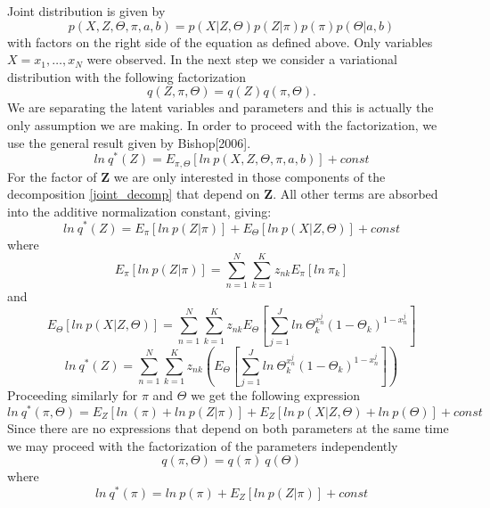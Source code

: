 \documentclass{article}
\newcommand\JointProb{p(X,Z,\Theta,\pi,a,b)}
\newcommand\ProbSingleCoin{\Theta_k^{x_n^j}(1-\Theta_k)^{1-x_n^j}}
\newcommand\SumK{\sum_{k=1}^{K}}
\newcommand\SumN{\sum_{n=1}^{N}}
\newcommand\SumJ{\sum_{j=1}^{J}}
\begin{document}
Joint distribution is given by
\begin{equation}\label{joint_decomp}
    \JointProb{} = p(X|Z,\Theta)p(Z|\pi)p(\pi)p(\Theta|a,b)
\end{equation}
with factors on the right side of the equation as defined above. Only variables $X={x_1,\dots,x_N}$ were observed. In the next step we consider a variational distribution with the following factorization
\begin{equation}\label{factor_decomp1}
q(Z, \pi, \Theta) = q(Z)q(\pi,\Theta).
\end{equation}
We are separating the latent variables and parameters and this is actually the only assumption we are making.
In order to proceed with the factorization, we use the general result given by Bishop[2006].
\begin{equation}
    ln\: q^*(Z)=E_{\pi,\Theta}[ln\:\JointProb] + const
\end{equation}
For the factor of \textbf{Z} we are only interested in those components of the decomposition \ref{joint_decomp} that depend on \textbf{Z}. All other terms are absorbed into the additive normalization constant, giving:
\begin{equation}
    ln\: q^*(Z)=E_{\pi}[ln\:p(Z|\pi)] + E_\Theta[ln\:p(X|Z,\Theta)] + const
\end{equation}
where
\begin{equation}
    E_{\pi}[ln\:p(Z|\pi)]  = \SumN\SumK z_{nk}E_\pi[ln\:\pi_k]
\end{equation}
and
\begin{equation}
    E_\Theta[ln\:p(X|Z,\Theta)] = \SumN\SumK z_{nk}E_\Theta[\SumJ ln\:\ProbSingleCoin]
\end{equation}
\begin{equation}
    ln\: q^*(Z)=\SumN\SumK z_{nk}\left(E_\Theta[\SumJ ln\:\ProbSingleCoin]\right)
\end{equation}
Proceeding similarly for \textbf{$\pi$} and \textbf{$\Theta$} we get the following expression
\begin{equation}
    ln\: q^*(\pi,\Theta)=E_{Z}[ln\:(\pi) + ln\:p(Z|\pi)] + E_Z[ln\:p(X|Z,\Theta) + ln\:p(\Theta)] + const
\end{equation}
Since there are no expressions that depend on both parameters at the same time we may proceed with the factorization of the parameters independently
\begin{equation}\label{factor_decomp2}
    q(\pi,\Theta) = q(\pi)\:q(\Theta)
\end{equation}
where
\begin{equation}
    ln\:q^*(\pi) = ln\:p(\pi) + E_{Z}[ln\:p(Z|\pi)] + const
\end{equation}
\end{document}
